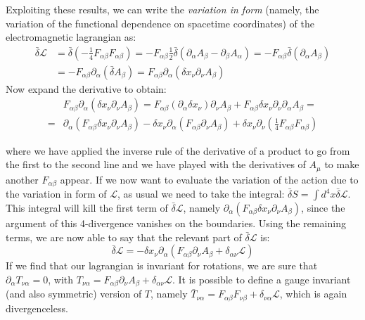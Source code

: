 \documentclass[class=article]{standalone}
\begin{document}
Exploiting these results, we can write the \textit{variation in form} (namely, the variation of the functional dependence on spacetime coordinates) of the electromagnetic lagrangian as:
\begin{align*}
\bar{\delta}\mathcal{L}&=\bar{\delta}\left(-\frac{1}{4}F_{\alpha\beta}F_{\alpha\beta}\right)=-F_{\alpha\beta}\frac{1}{2}\bar{\delta}(\partial_{\alpha}A_{\beta}-\partial_{\beta}A_{\alpha})=-F_{\alpha\beta}\bar{\delta}(\partial_{\alpha}A_{\beta})\\
&=-F_{\alpha\beta}\partial_{\alpha}(\bar{\delta}A_{\beta})=F_{\alpha\beta}\partial_{\alpha}(\delta x_{\nu}\partial_{\nu}A_{\beta})
\end{align*}
Now expand the derivative to obtain:
\begin{align*}
&F_{\alpha\beta}\partial_{\alpha}(\delta x_{\nu}\partial_{\nu}A_{\beta})=F_{\alpha\beta}(\partial_{\alpha}\delta x_{\nu})\partial_{\nu}A_{\beta}+F_{\alpha\beta}\delta x_{\nu}\partial_{\nu}\partial_{\alpha}A_{\beta}=\\
=&\partial_{\alpha}(F_{\alpha\beta}\delta x_{\nu}\partial_{\nu}A_{\beta})-\delta x_{\nu}\partial_{\alpha}(F_{\alpha\beta}\partial_{\nu}A_{\beta})+\delta x_{\nu}\partial_{\nu}\left(\frac{1}{4}F_{\alpha\beta}F_{\alpha\beta}\right)
\end{align*}

where we have applied the inverse rule of the derivative of a product to go from the first to the second line and we have played with the derivatives of $A_{\mu}$ to make another $F_{\alpha\beta}$ appear. If we now want to evaluate the variation of the action due to the variation in form of $\mathcal{L}$, as usual we need to take the integral: $\bar{\delta}S=\int d^4x\bar{\delta}\mathcal{L}$. This integral will kill the first term of $\bar{\delta}\mathcal{L}$, namely $\partial_{\alpha}(F_{\alpha\beta}\delta x_{\nu}\partial_{\nu}A_{\beta})$, since the argument of this 4-divergence vanishes on the boundaries. Using the remaining terms, we are now able to say that the relevant part of $\bar{\delta}\mathcal{L}$ is:
\begin{equation}
\bar{\delta}\mathcal{L}=-\delta x_{\nu}\partial_{\alpha}(F_{\alpha\beta}\partial_{\nu}A_{\beta}+\delta_{\alpha\nu}\mathcal{L})
\end{equation}
If we find that our lagrangian is invariant for rotations, we are sure that $\partial_{\alpha}T_{\nu\alpha}=0$, with $T_{\nu\alpha}=F_{\alpha\beta}\partial_{\nu}A_{\beta}+\delta_{\alpha\nu}\mathcal{L}$. It is possible to define a gauge invariant (and also symmetric) version of $T$, namely $\bar{T}_{\nu\alpha}=F_{\alpha\beta}F_{\nu\beta}+\delta_{\nu\alpha}\mathcal{L}$, which is again divergenceless.
\end{document}
